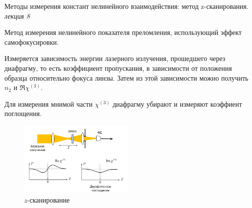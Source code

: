 
\begin{leftrules}
Методы измерения констант нелинейного взаимодействия: метод z-сканирования.
\\ \phantom{42} \hfill \textit{лекция 8} 
\end{leftrules}

Метод измерения нелинейного показателя преломления, использующий эффект самофокусировки.

Измеряется зависимость энергии лазерного излучения, прошедшего через диафрагму, то есть коэффициент пропускания, в зависимости от положения образца относительно фокуса линзы. Затем из этой зависимости можно получить $n_2$ и $\Re \chi^{(3)}$.

Для измерения мнимой части $\chi^{(3)}$ диафрагму убирают и измеряют коэффиент поглощения.

\begin{figure}[ht]
    \centering
    \includegraphics[width=0.5\textwidth]{figures/18_1.png}
    \caption{$z$-сканирование}
\end{figure}

